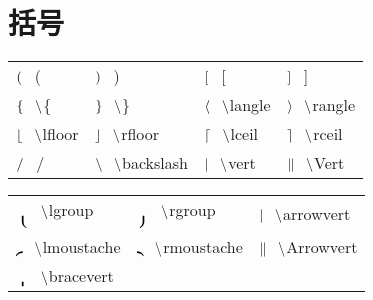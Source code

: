\documentclass{ctexart}
\newcommand{\pair}[2]{${#1} \hspace{0.3cm} \backslash ${#2}}
\newcommand{\nbpair}[2]{${#1} \hspace{0.3cm} ${#2}} %
\begin{document}
\section{括号}
\begin{tabular}{p{3cm}p{3cm}p{3cm}p{3cm}}
    \nbpair{(}{(}          & \nbpair{)}{)}                & \nbpair{[}{[}          & \nbpair{]}{]}          \\
    \pair{\{}{\{}          & \pair{\}}{\}}                & \pair{\langle}{langle} & \pair{\rangle}{rangle} \\
    \pair{\lfloor}{lfloor} & \pair{\rfloor}{rfloor}       & \pair{\lceil}{lceil}   & \pair{\rceil}{rceil}   \\
    \nbpair{/}{/}          & \pair{\backslash}{backslash} & \pair{\vert}{vert}     & \pair{\Vert}{Vert}     \\
\end{tabular}
\newline
\begin{tabular}{p{4.8cm}p{4.8cm}p{4.8cm}}
    \pair{\lgroup}{lgroup}         & \pair{\rgroup}{rgroup}         & \pair{\arrowvert}{arrowvert} \\
    \pair{\lmoustache}{lmoustache} & \pair{\rmoustache}{rmoustache} & \pair{\Arrowvert}{Arrowvert} \\
    \pair{\bracevert}{bracevert}   &                                &                              \\
\end{tabular}
\end{document}
